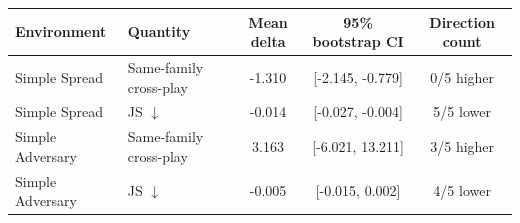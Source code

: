 \begin{tabular}{llccc}
\toprule
Environment & Quantity & Mean delta & 95\% bootstrap CI & Direction count \\
\midrule
Simple Spread & Same-family cross-play & -1.310 & [-2.145, -0.779] & 0/5 higher \\
Simple Spread & JS $\downarrow$ & -0.014 & [-0.027, -0.004] & 5/5 lower \\
\midrule
Simple Adversary & Same-family cross-play & 3.163 & [-6.021, 13.211] & 3/5 higher \\
Simple Adversary & JS $\downarrow$ & -0.005 & [-0.015, 0.002] & 4/5 lower \\
\bottomrule
\end{tabular}

